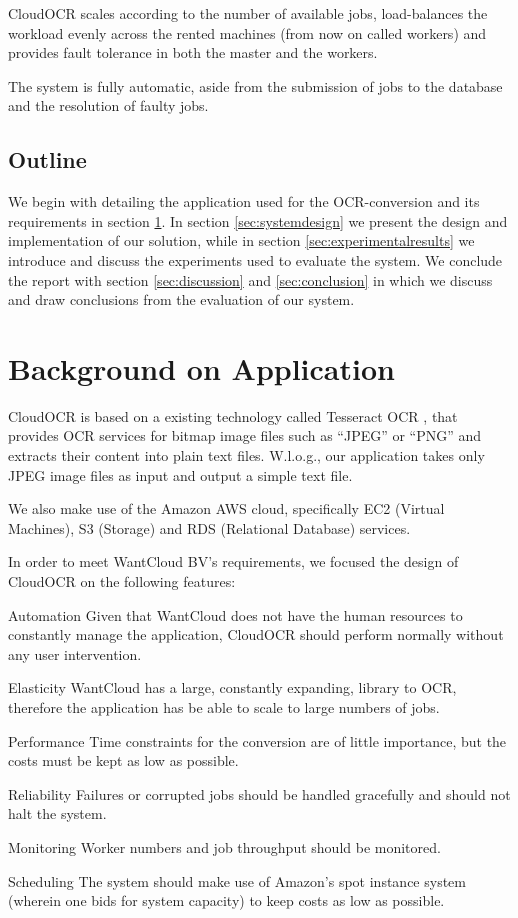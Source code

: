 \documentclass[a4paper]{IEEEtran}
\begin{document}
CloudOCR scales according to the number of available jobs, load-balances the workload evenly across the rented machines (from now on called workers) and provides fault tolerance in both the master and the workers. 

The system is fully automatic, aside from the submission of jobs to the database and the resolution of faulty jobs.

\subsection*{Outline}
We begin with detailing the application used for the OCR-conversion and its requirements in section \ref{sec:backgroundonapplication}. In section \ref{sec:systemdesign} we present the design and implementation of our solution, while in section \ref{sec:experimentalresults} we introduce and discuss the experiments used to evaluate the system. We conclude the report with section \ref{sec:discussion}  and \ref{sec:conclusion} in which we discuss and draw conclusions from the evaluation of our system.

\section{Background on Application}
\label{sec:backgroundonapplication}
CloudOCR is based on a existing technology called Tesseract OCR \cite{tesseractocr}, that provides OCR services for bitmap image files such as ``JPEG'' or ``PNG'' and extracts their content into plain text files. W.l.o.g., our application takes only JPEG image files as input and output a simple text file.

We also make use of the Amazon AWS cloud, specifically EC2 (Virtual Machines), S3 (Storage) and RDS (Relational Database) services.

In order to meet WantCloud BV's requirements, we focused the design of CloudOCR on the following features: 
\begin{LaTeXdescription}
	\item[Automation] Given that WantCloud does not have the human resources to constantly manage the application, CloudOCR should perform normally without any user intervention.
	\item[Elasticity] WantCloud has a large, constantly expanding, library to OCR, therefore the application has be able to scale to large numbers of jobs.
	\item[Performance] Time constraints for the conversion are of little importance, but the costs must be kept as low as possible.
	\item[Reliability] Failures or corrupted jobs should be handled gracefully and should not halt the system.
	\item[Monitoring] Worker numbers and job throughput should be monitored.
	\item[Scheduling] The system should make use of Amazon's spot instance system (wherein one bids for system capacity) to keep costs as low as possible.
\end{LaTeXdescription}
\end{document}
